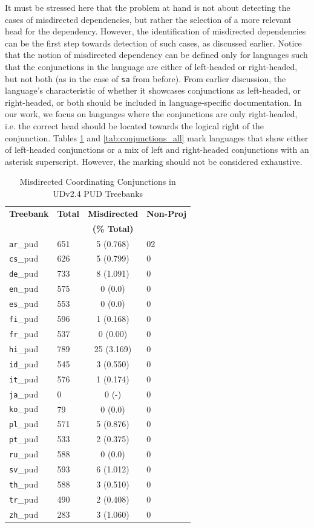 It must be stressed here that the problem at hand is not about detecting the cases of misdirected dependencies, but rather the selection of a more relevant head for the dependency. However, the identification of misdirected dependencies can be the first step towards detection of such cases, as discussed earlier. Notice that the notion of misdirected dependency can be defined only for languages such that the conjunctions in the language are either of left-headed or right-headed, but not both (as in the case of \verb|sa| from before). From earlier discussion, the language's characteristic of whether it showcases conjunctions as left-headed, or right-headed, or both should be included in language-specific documentation. In our work, we focus on languages where the conjunctions are only right-headed, i.e. the correct head should be located towards the logical right of the conjunction. Tables \ref{tab:conjunctions_pud} and \ref{tab:conjunctions_all} mark languages that show either of left-headed conjunctions or a mix of left and right-headed conjunctions with an asterisk superscript. However, the marking should not be considered exhaustive.

\begin{table}[h]
\centering
\begin{tabular}{|l|l|c|l|}
\hline
\textbf{Treebank} & \textbf{Total} & \textbf{Misdirected} & \textbf{Non-Proj}\\
 & & \textbf{(\% Total)} & \\
\hline
\texttt{ar}\_pud & 651 & 5 (0.768) & 02\\
\texttt{cs}\_pud & 626 & 5 (0.799) & 0\\
\texttt{de}\_pud & 733 & 8 (1.091) & 0\\
\texttt{en}\_pud & 575 & 0 (0.0) & 0\\
\texttt{es}\_pud & 553 & 0 (0.0) & 0\\
\texttt{fi}\_pud & 596 & 1 (0.168) & 0\\
\texttt{fr}\_pud & 537 & 0 (0.00) & 0\\
\texttt{hi}\_pud & 789 & 25 (3.169) & 0\\
\texttt{id}\_pud & 545 & 3 (0.550) & 0\\
\texttt{it}\_pud & 576 & 1 (0.174) & 0\\
\texttt{ja}\_pud & 0 & 0 (-) & 0\\
\texttt{ko}\_pud & 79 & 0 (0.0) & 0\\
\texttt{pl}\_pud & 571 & 5 (0.876) & 0\\
\texttt{pt}\_pud & 533 & 2 (0.375) & 0\\
\texttt{ru}\_pud & 588 & 0 (0.0) & 0\\
\texttt{sv}\_pud & 593 & 6 (1.012) & 0\\
\texttt{th}\_pud & 588 & 3 (0.510) & 0\\
\texttt{tr}\_pud & 490 & 2 (0.408) & 0\\
\texttt{zh}\_pud & 283 & 3 (1.060) & 0\\
\hline
\end{tabular}
\caption{Misdirected Coordinating Conjunctions in UDv2.4 PUD Treebanks}
\label{tab:conjunctions_pud}
\end{table}

